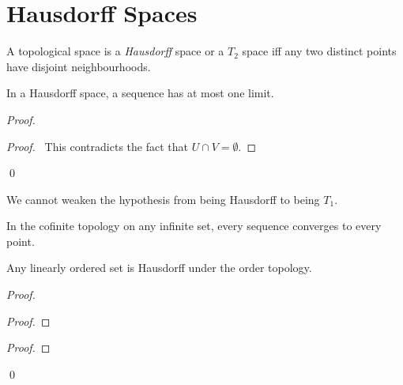 \section{Hausdorff Spaces}

\begin{df}[Hausdorff]
A topological space is a \emph{Hausdorff} space or a \emph{$T_2$} space iff any two distinct points have disjoint neighbourhoods.
\end{df}

\begin{prop}
In a Hausdorff space, a sequence has at most one limit.
\end{prop}

\begin{proof}
\pf
{}
\qedstep
\begin{proof}
	\pf\ This contradicts the fact that $U \cap V = \emptyset$.
\end{proof}
\qed
\end{proof}

\begin{ex}
We cannot weaken the hypothesis from being Hausdorff to being $T_1$.

In the cofinite topology on any infinite set, every sequence converges to every point.
\end{ex}

\begin{prop}
Any linearly ordered set is Hausdorff under the order topology.
\end{prop}

\begin{proof}
\pf
{}
\begin{proof}
\end{proof}
\begin{proof}
\end{proof}
\qed
\end{proof}

